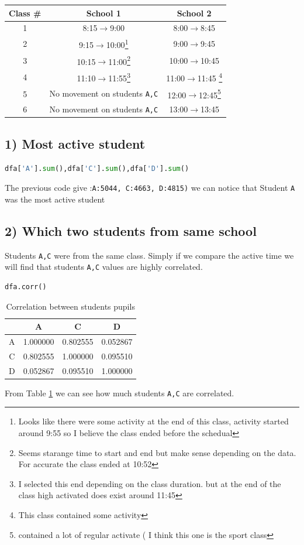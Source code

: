 \documentclass[10pt]{article}
\begin{document}
\begin{tabular}{|c|c|c|}
\hline
\textbf{Class \#}&\textbf{School 1}&\textbf{School 2}\\
\hline
1 &8:15\(\rightarrow\)9:00&8:00\(\rightarrow\)8:45\\
\hline
2 &9:15\(\rightarrow\)10:00\footnote{Looks like there were some activity at the end of this class, activity started around 9:55 so I believe the class ended before the schedual}&9:00\(\rightarrow\)9:45\\
\hline
3 &10:15\(\rightarrow\)11:00\footnote{Seems starange time to start and end but make sense depending on the data. For accurate the class ended at 10:52}&10:00\(\rightarrow\)10:45\\
\hline
4 &11:10\(\rightarrow\)11:55\footnote{I selected this end depending on the class duration. but at the end of the class high activated does exist around 11:45}&11:00\(\rightarrow\)11:45 \footnote{This class contained some activity}\\
\hline
5&No movement on students \texttt{A,C}&12:00\(\rightarrow\)12:45\footnote{contained a lot of regular activate ( I think this one is the sport class}\\
\hline
6&No movement on students \texttt{A,C}&13:00\(\rightarrow\)13:45\\
\hline
\end{tabular}

\subsection*{1) Most active student}
\begin{lstlisting}[language=python]
dfa['A'].sum(),dfa['C'].sum(),dfa['D'].sum()
\end{lstlisting}
The previous code give :\texttt{A:5044, C:4663, D:4815)} we can notice that Student \texttt{A} was the most active student
\subsection*{2) Which two students from same school}
Students \texttt{A,C} were from the same class. Simply if we compare the active time we will find that students \texttt{A,C} values are highly correlated. 
\begin{lstlisting}[language=python]
dfa.corr()
\end{lstlisting}
\begin{table}[H]
\center
\begin{tabular}{|c|c|c|c|}
\hline
 &	A &	C 	&D \\
 	\hline
A &	1.000000 &	0.802555 	&0.052867\\
\hline
C 	&0.802555 	&1.000000 &	0.095510\\
\hline
D &	0.052867 &	0.095510 &	1.000000\\
\hline
\end{tabular}
\caption{Correlation between students pupils \label{table:1}}
\end{table}
From Table \ref{table:1} we can see how much students \texttt{A,C} are correlated.
\end{document}
